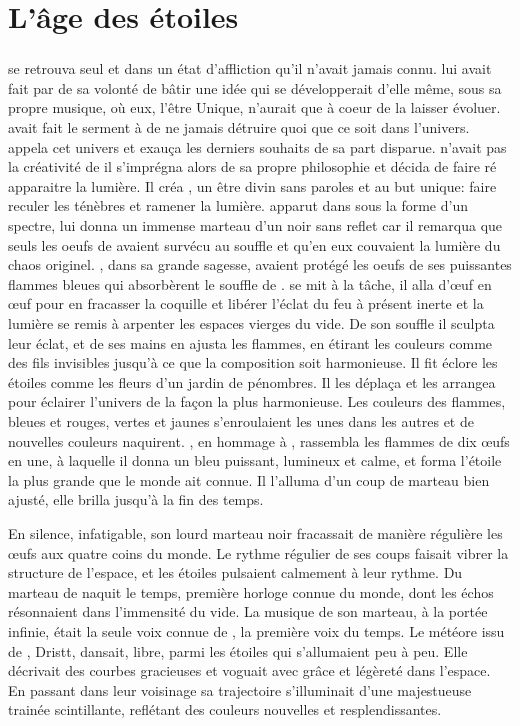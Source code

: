 \chapter{L'âge des étoiles}

\subsection{\Cind}

\Cind se retrouva seul et dans un état d'affliction qu'il n'avait jamais connu. \Mey lui avait fait par de sa volonté de bâtir une idée qui se développerait d'elle même, sous sa propre musique, où eux, l'être Unique, n'aurait que à coeur de la laisser évoluer. \Cind avait fait le serment à \Mey de ne jamais détruire quoi que ce soit dans l'univers. \Cind appela cet univers \dreyma et exauça les derniers souhaits de sa part disparue. \Cind n'avait pas la créativité de \Mey il s'imprégna alors de sa propre philosophie et décida de faire ré apparaitre la lumière. Il créa \carac, un être divin sans paroles et au but unique: faire reculer les ténèbres et ramener la lumière. \carac apparut dans \dreyma sous la forme d'un spectre, \Cind lui donna un immense marteau d'un noir sans reflet car il remarqua que seuls les oeufs de \Tot avaient survécu au souffle et qu'en eux couvaient la lumière du chaos originel. \Boromu, dans sa grande sagesse, avaient protégé les oeufs de ses puissantes flammes bleues qui absorbèrent le souffle de \Cind.  \carac se mit à la tâche, il alla d'œuf en œuf pour en fracasser la coquille et libérer l'éclat du feu à présent inerte et la lumière se remis à arpenter les espaces vierges du vide. De son souffle il sculpta leur éclat, et de ses mains en ajusta les flammes, en étirant les couleurs comme des fils invisibles jusqu'à ce que la composition soit harmonieuse. Il fit éclore les étoiles comme les fleurs d'un jardin de pénombres. Il les déplaça et les arrangea pour éclairer l'univers de la façon la plus harmonieuse. Les couleurs des flammes, bleues et rouges, vertes et jaunes s'enroulaient les unes dans les autres et de nouvelles couleurs naquirent. \carac, en hommage à \Boromu, rassembla les flammes de dix œufs en une, à laquelle il donna un bleu puissant, lumineux et calme, et forma l'étoile la plus grande que le monde ait connue. Il l'alluma d'un coup de marteau bien ajusté, elle brilla jusqu'à la fin des temps. 

En silence, infatigable, son lourd marteau noir fracassait de manière régulière les œufs aux quatre coins du monde. Le rythme régulier de ses coups faisait vibrer la structure de l'espace, et les étoiles pulsaient calmement à leur rythme. Du marteau de \carac naquit le temps, première horloge connue du monde, dont les échos résonnaient dans l'immensité du vide. La musique de son marteau, à la portée infinie, était la seule voix connue de \carac, la première voix du temps. Le météore issu de \Mey, Dristt, dansait, libre, parmi les étoiles qui s'allumaient peu à peu. Elle décrivait des courbes gracieuses et voguait avec grâce et légèreté dans l'espace. En passant dans leur voisinage sa trajectoire s'illuminait d'une majestueuse trainée scintillante, reflétant des couleurs nouvelles et resplendissantes.



